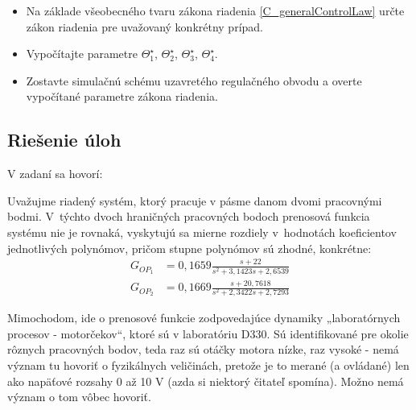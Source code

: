\documentclass[a4paper, 10pt, ]{article}
\begin{document}
\begin{enumerate}[leftmargin=0pt, labelsep=4mm, itemsep=0pt]
    \begin{itemize}[leftmargin=0pt, labelsep=4mm, itemsep=0pt]
    	\item Na základe všeobecného tvaru zákona riadenia \eqref{C_generalControlLaw} určte zákon riadenia pre uvažovaný konkrétny prípad.
    	\item Vypočítajte parametre $\Theta_1^\star$, $\Theta_2^\star$, $\Theta_3^\star$, $\Theta_4^\star$.
    	\item Zostavte simulačnú schému uzavretého regulačného obvodu a overte vypočítané parametre zákona riadenia.
    \end{itemize}





\end{enumerate}



















\subsection{Riešenie úloh}



V zadaní sa hovorí:

\smallskip

{\color{gray}

\noindent
Uvažujme riadený systém, ktorý pracuje v pásme danom dvomi pracovnými bodmi. V~týchto dvoch hraničných pracovných bodoch prenosová funkcia systému nie je rovnaká, vyskytujú sa mierne rozdiely v~hodnotách koeficientov jednotlivých polynómov, pričom stupne polynómov sú zhodné, konkrétne:
\begin{align*}
    G_{OP_1} &= 0,1659 \frac{s + 22}{ s^2 + 3,1423 s + 2,6539} 	\\
    G_{OP_2} &= 0,1669 \frac{s + 20,7618}{s^2 + 2,3422s + 2,7293}
\end{align*}

}

\smallskip

Mimochodom, ide o prenosové funkcie zodpovedajúce dynamiky „laboratórnych procesov - motorčekov“, ktoré sú v laboratóriu D330. Sú identifikované pre okolie rôznych pracovných bodov, teda raz sú otáčky motora nízke, raz vysoké - nemá význam tu hovoriť o fyzikálnych veličinách, pretože je to merané (a ovládané) len ako napäťové rozsahy 0 až 10 V (azda si niektorý čitateľ spomína). Možno nemá význam o tom vôbec hovoriť.
\end{document}
